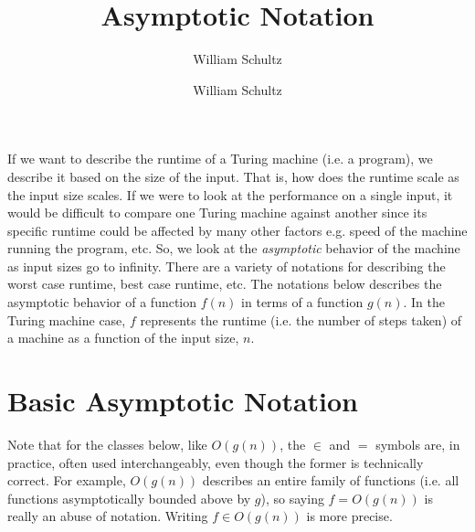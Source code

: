 \documentclass[10pt,a4paper]{article}
\author{William Schultz}
\begin{document}
\title{Asymptotic Notation}
\author{William Schultz}
\maketitle
 
If we want to describe the runtime of a Turing machine (i.e. a program), we describe it based on the size of the input. That is, how does the runtime scale as the input size scales. If we were to look at the performance on a single input, it would be difficult to compare one Turing machine against another since its specific runtime could be affected by many other factors e.g. speed of the machine running the program, etc. So, we look at the \textit{asymptotic} behavior of the machine as input sizes go to infinity. There are a variety of notations for describing the worst case runtime, best case runtime, etc. The notations below describes the asymptotic behavior of a function $f(n)$ in terms of a function $g(n)$. In the Turing machine case, $f$ represents the runtime (i.e. the number of steps taken) of a machine as a function of the input size, $n$.

\section*{Basic Asymptotic Notation}

Note that for the classes below, like $O(g(n))$, the $\in$ and $=$ symbols are, in practice, often used interchangeably, even though the former is technically correct. For example, $O(g(n))$ describes an entire family of functions (i.e. all functions asymptotically bounded above by $g$), so saying $f = O(g(n))$ is really an abuse of notation. Writing $f \in O(g(n))$ is more precise.
\end{document}
